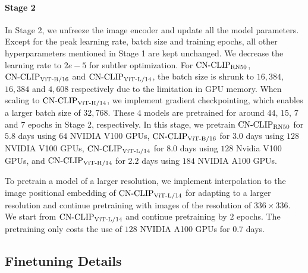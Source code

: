 \documentclass[11pt]{article}
\begin{document}
\paragraph{Stage 2} 
In Stage 2, we unfreeze the image encoder and update all the model parameters. Except for the peak learning rate, batch size and training epochs, all other hyperparameters mentioned in Stage 1 are kept unchanged. We decrease the learning rate to $2e-5$ for subtler optimization. For $\text{CN-CLIP}\rm_{RN50}$, $\text{CN-CLIP}\rm_{ViT\text{-}B/16}$ and $\text{CN-CLIP}\rm_{ViT\text{-}L/14}$, the batch size is shrunk to $16,384$, $16,384$ and $4,608$ respectively due to the limitation in GPU memory. When scaling to $\text{CN-CLIP}\rm_{ViT\text{-}H/14}$, we implement gradient checkpointing, which enables a larger batch size of $32,768$. These $4$ models are pretrained for around $44$, $15$, $7$ and $7$ epochs in Stage 2, respectively.
In this stage, we pretrain $\text{CN-CLIP}\rm_{RN50}$ for $5.8$ days using $64$ NVIDIA V100 GPUs, $\text{CN-CLIP}\rm_{ViT\text{-}B/16}$ for $3.0$ days using $128$ NVIDIA V100 GPUs, $\text{CN-CLIP}\rm_{ViT\text{-}L/14}$ for $8.0$ days using $128$ Nvidia V100 GPUs, and $\text{CN-CLIP}\rm_{ViT\text{-}H/14}$ for $2.2$ days using $184$ NVIDIA A100 GPUs. 

To pretrain a model of a larger resolution, we implement interpolation to the image positional embedding of $\text{CN-CLIP}\rm_{ViT\text{-}L/14}$ for adapting to a larger resolution and continue pretraining with images of the resolution of $336 \times 336$. 
We start from $\text{CN-CLIP}\rm_{ViT\text{-}L/14}$ and continue pretraining by $2$ epochs. 
The pretraining only costs the use of $128$ NVIDIA A100 GPUs for $0.7$ days.

\subsection{Finetuning Details}
\end{document}
